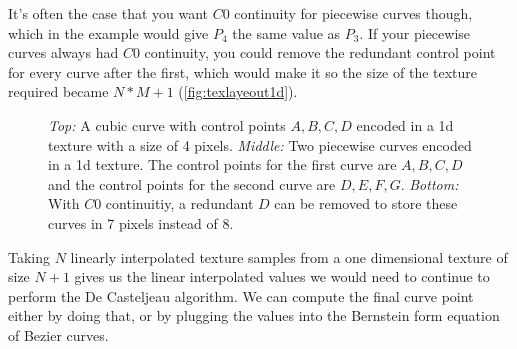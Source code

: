 \documentclass{jcgt}
\begin{document}
It's often the case that you want $C0$ continuity for piecewise curves though, which in the example would give $P_4$ the same value as $P_3$.  If your piecewise curves always had $C0$ continuity, you could remove the redundant control point for every curve after the first, which would make it so the size of the texture required became $N*M+1$ (\autoref{fig:texlayeout1d}).

  \begin{figure}

    \vspace{5mm}


    \vspace{5mm}

    \caption{\textit{Top:} A cubic curve with control points $A,B,C,D$ encoded in a 1d texture with a size of 4 pixels.  \textit{Middle:} Two piecewise curves encoded in a 1d texture.  The control points for the first curve are $A,B,C,D$ and the control points for the second curve are $D,E,F,G$.  \textit{Bottom:} With $C0$ continuitiy, a redundant $D$ can be removed to store these curves in 7 pixels instead of 8. }    
    \label{fig:texlayeout1d}
  \end{figure}

Taking $N$ linearly interpolated texture samples from a one dimensional texture of size $N+1$ gives us the linear interpolated values we would need to continue to perform the De Casteljeau algorithm.  We can compute the final curve point either by doing that, or by plugging the values into the Bernstein form equation of Bezier curves.
\end{document}
